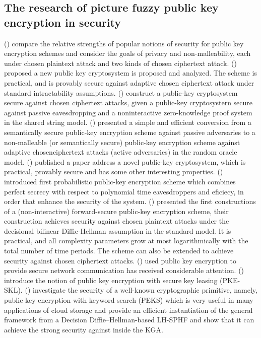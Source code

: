 \documentclass[graybox]{svmult}
\begin{document}
\subsection{The research of picture fuzzy public key encryption in security}
\citeauthor{bellare2006relations} (\citeyear{bellare2006relations}) compare the relative strengths of popular notions of security for public key encryption schemes and consider the goals of privacy and non-malleability, each under chosen plaintext attack and two kinds of chosen ciphertext attack.
\citeauthor{cramer1998practical} (\citeyear{cramer1998practical}) proposed a new public key cryptosystem is proposed and analyzed.
The scheme is practical, and is provably secure against adaptive chosen ciphertext attack under standard intractability assumptions.
\citeauthor{naor1990public} (\citeyear{naor1990public}) construct a public-key cryptosystem secure against chosen ciphertezt attacks, given a public-key cryptosystern secure against passive eavesdropping and a noninteractive zero-knowledge proof system in the shared string model.
\citeauthor{fujisaki1999enhance} (\citeyear{fujisaki1999enhance}) presented a simple and efficient conversion from a semantically secure public-key encryption scheme against passive adversaries to a non-malleable (or semantically secure) public-key encryption scheme against adaptive chosenciphertext attacks (active adversaries) in the random oracle model.
\citeauthor{okamoto1998new} (\citeyear{okamoto1998new}) published a paper address a novel public-key cryptosystem, which is practical, provably secure and has some other interesting properties.
\citeauthor{blum1985efficient} (\citeyear{blum1985efficient}) introduced first probabilistic public-key encryption scheme which combines perfect secrecy with respect to polynomial time eavesdroppers and eficiecy, in order that enhance the security of the system.
\citeauthor{canetti2003forward} (\citeyear{canetti2003forward}) presented the first constructions of a (non-interactive) forward-secure public-key encryption scheme, their construction achieves security against chosen plaintext attacks under the decisional bilinear Diffie-Hellman assumption in the standard model.
It is practical, and all complexity parameters grow at most logarithmically with the total number of time periods.
The scheme can also be extended to achieve security against chosen ciphertext attacks.
\citeauthor{dolev1983security} (\citeyear{dolev1983security}) used public key encryption to provide secure network communication has received considerable attention.
\citeauthor{agrawal2023public} (\citeyear{agrawal2023public}) introduce the notion of public key encryption with secure key leasing (PKE-SKL).
\citeauthor{chen2016dual} (\citeyear{chen2016dual}) investigate the security of a well-known cryptographic primitive, namely, public key encryption with keyword search (PEKS) which is very useful in many applications of cloud storage and provide an efficient instantiation of the general framework from a Decision Diffie–Hellman-based LH-SPHF and show that it can achieve the strong security against inside the KGA.
\end{document}
